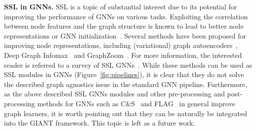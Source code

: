 \documentclass{article} %
\begin{document}
\textbf{SSL in GNNs.} 
SSL is a topic of substantial interest due to its potential for improving the performance of GNNs on various tasks. Exploiting the correlation between node features and the graph structure is known to lead to better node representations or GNN initialization~\citep{Hu*2020Strategies,you2018graphrnn,you2020graph,hu2020gpt}. Several methods have been proposed for improving node representations, including (variational) graph autoencoders~\citep{kipf2016variational}, Deep Graph Infomax~\citep{velickovic2019deep} and GraphZoom~\citep{deng2020graphzoom}. For more information, the interested reader is referred to a survey of SSL GNNs~\citep{xie2021self}. While these methods can be used as SSL modules in GNNs (Figure~\ref{fig:pipelines}), it is clear that they do not solve the described graph agnostics issue in the standard GNN pipeline. %
Furthermore, as the above described SSL GNNs modules and other pre-processing and post-processing methods for GNNs such as C\&S~\citep{huang2021combining} and FLAG~\citep{kong2020flag} in general improve graph learners, it is worth pointing out that they can be naturally be integrated into the GIANT framework. This topic is left as a future work.  
\end{document}
